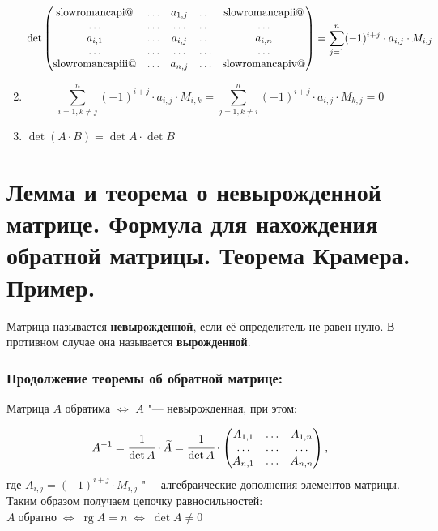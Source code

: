 \documentclass{article}
\makeatletter
\newcommand*{\rom}[1]{\expandafter\@slowromancap\romannumeral #1@}
\makeatother
\begin{document}
\begin{enumerate}
	\begin{equation*}\operatorname{det}
	\begin{pmatrix}
	\text{\rom{1}} & \ldots & a_{1, j} & \ldots &\text{\rom{2}}\\
	\ldots & \ldots & \ldots & \ldots & \ldots\\
	a_{i, 1} & \ldots & a_{i, j} & \ldots & a_{i, n}\\
	\ldots & \ldots&\ldots &\ldots & \ldots\\
	\text{\rom{3}} & \ldots & a_{n, j} & \ldots & \text{\rom{4}}
	\end{pmatrix} = \sum_{j = 1}^{n} (-1)^{i + j} \cdot a_{i, j} \cdot M_{i, j}
	\end{equation*}
	\item $$\sum_{i = 1, k \neq j}^{n}(-1)^{i+j}\cdot a_{i, j} \cdot M_{i, k} = \sum_{j = 1, k \neq i}^{n} (-1)^{i + j} \cdot a_{i, j} \cdot M_{k, j} = 0$$
	\item $\operatorname{det}(A\cdot B) = \operatorname{det}A \cdot \operatorname{det}B$
\end{enumerate}
\newpage
\section{Лемма и теорема о невырожденной матрице. Формула для нахождения обратной матрицы. Теорема Крамера. Пример.}
Матрица называется \textbf{невырожденной}, если её определитель не равен нулю. В противном случае она называется \textbf{вырожденной}.

\subsubsection{Продолжение теоремы об обратной матрице:}
Матрица $A$ обратима $\Leftrightarrow$ $A$ "--- невырожденная, при этом:

\begin{equation*}A^{-1} = \cfrac{1}{\operatorname{det}A} \cdot \widetilde{A} = \cfrac{1}{\operatorname{det}A} \cdot
\begin{pmatrix}
A_{1, 1} & \ldots & A_{1, n}\\
\ldots & \ldots & \ldots\\
A_{n, 1} & \ldots & A_{n, n}
\end{pmatrix}\text{,}
\end{equation*} где $A_{i, j} = (-1)^{i + j} \cdot M_{i, j}$ "--- алгебраические дополнения элементов матрицы.
Таким образом получаем цепочку равносильностей:
$A \; \text{обратно} \;\Leftrightarrow\; \operatorname{rg}A = n\;\Leftrightarrow\; \operatorname{det}A \neq 0$
\end{document}
